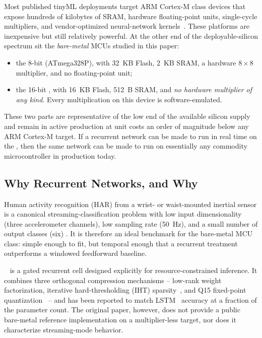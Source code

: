 Most published tinyML deployments target ARM Cortex-M class devices
that expose hundreds of kilobytes of SRAM, hardware floating-point
units, single-cycle multipliers, and vendor-optimized neural-network
kernels~\cite{lai2018cmsisnn,david2021tflitemicro,lin2020mcunet}.
These platforms are inexpensive but still relatively powerful.
At the other end of the deployable-silicon spectrum sit the
\emph{bare-metal} MCUs studied in this paper:
\begin{itemize}
\item the 8-bit \arduino{} (ATmega328P), with 32~KB Flash, 2~KB
SRAM, a hardware $8{\times}8$ multiplier, and no floating-point unit;
\item the 16-bit \msp{}, with 16~KB Flash, 512~B SRAM, and
\emph{no hardware multiplier of any kind}. Every multiplication
on this device is software-emulated.
\end{itemize}
These two parts are representative of the low end of the available
silicon supply and remain in active production at unit costs an
order of magnitude below any ARM Cortex-M target. If a recurrent
network can be made to run in real time on the \msp{}, then the same
network can be made to run on essentially any commodity
microcontroller in production today.

\subsection{Why Recurrent Networks, and Why \fastgrnn{}}

Human activity recognition (HAR) from a wrist- or waist-mounted
inertial sensor is a canonical streaming-classification problem
with low input dimensionality (three accelerometer channels), low
sampling rate (50~Hz), and a small number of output classes (six)
\cite{anguita2013public,reyes2015transition}. It is therefore an
ideal benchmark for the bare-metal MCU class: simple enough to fit,
but temporal enough that a recurrent treatment outperforms a
windowed feedforward baseline.

\fastgrnn{}~\cite{kusupati2018fastgrnn} is a gated recurrent cell
designed explicitly for resource-constrained inference. It combines
three orthogonal compression mechanisms -- low-rank weight
factorization, iterative hard-thresholding (IHT)
sparsity~\cite{blumensath2009iht}, and Q15 fixed-point
quantization~\cite{jacob2018integer,han2016deepcompression} -- and
has been reported to match LSTM~\cite{hochreiter1997lstm} accuracy
at a fraction of the parameter count. The original paper, however,
does not provide a public bare-metal reference implementation on a
multiplier-less target, nor does it characterize streaming-mode
behavior.

